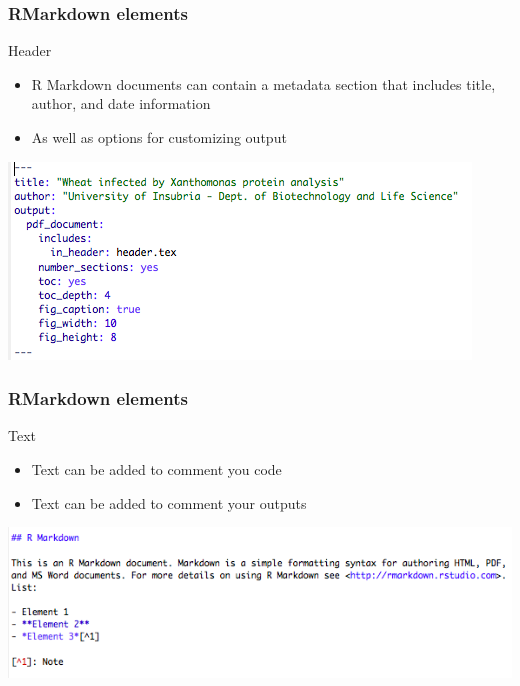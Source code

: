\documentclass{beamer}
\begin{document}
\begin{frame}
    \frametitle{RMarkdown elements}
    \centering \Large Header
    \normalsize
    	\begin{itemize}
		\item R Markdown documents can contain a metadata section that includes title, author, and date information 
		\item As well as options for customizing output
	\end{itemize}
	\begin{center}	\includegraphics[scale=0.6]{figures/RMarkdown_hearder.png} \end{center}
    
\end{frame}

\begin{frame}
    \frametitle{RMarkdown elements}
    \centering \Large Text
    \normalsize
    	\begin{itemize}
		\item Text can be added to comment you code
		\item Text can be added to comment your outputs
	\end{itemize}
	\begin{center}	\includegraphics[scale=0.6]{figures/RMarkdown_text.png} \end{center}
\end{frame}
\end{document}
